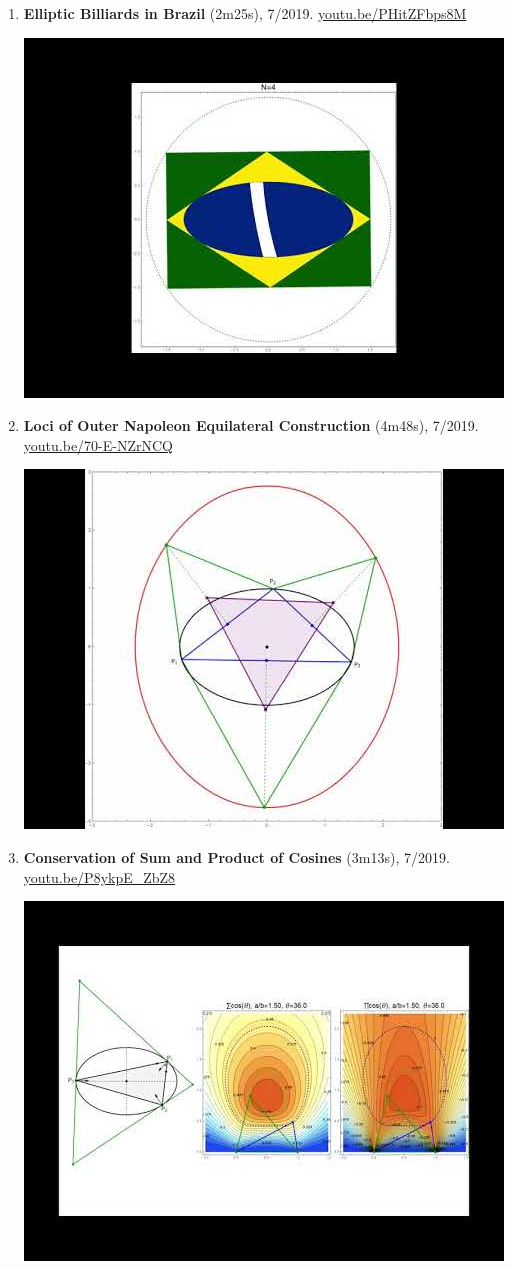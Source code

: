 \documentclass[12pt]{article}
\begin{document}
\begin{enumerate}[resume]
\item \textbf{Elliptic Billiards in Brazil} (2m25s), 7/2019. \href{https://youtu.be/PHitZFbps8M}{\url{youtu.be/PHitZFbps8M}}
\begin{center}\includegraphics[width=.5\textwidth]{pics/PHitZFbps8M.jpg}\end{center}
% 
\item \textbf{Loci of Outer Napoleon Equilateral Construction} (4m48s), 7/2019. \href{https://youtu.be/70-E-NZrNCQ}{\url{youtu.be/70-E-NZrNCQ}}
\begin{center}\includegraphics[width=.5\textwidth]{pics/70-E-NZrNCQ.jpg}\end{center}
% 
\item \textbf{Conservation of Sum and Product of Cosines} (3m13s), 7/2019. \href{https://youtu.be/P8ykpE_ZbZ8}{\url{youtu.be/P8ykpE\_ZbZ8}}
\begin{center}\includegraphics[width=.5\textwidth]{pics/P8ykpE_ZbZ8.jpg}\end{center}

\end{enumerate}
\end{document}

